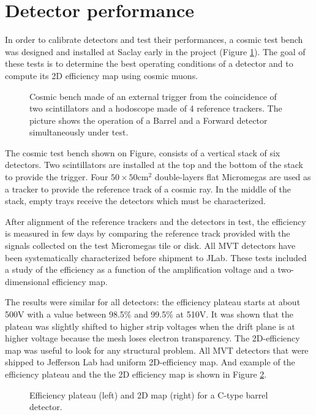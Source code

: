 \section{Detector performance}

In order to calibrate detectors and test their performances, a cosmic test bench was designed and installed at Saclay early in the project (Figure \ref{fig:mm-testbench}). The goal of these tests is to determine the best operating conditions of a detector and to compute its 2D efficiency map using cosmic muons.


\begin{figure}[htb]
 \caption{Cosmic bench made of an external trigger from the coincidence of two scintillators and a hodoscope made of 4 reference trackers. The picture shows the operation of a Barrel and a Forward detector simultaneously under test.}
 \label{fig:mm-testbench}
\end{figure}

The cosmic test bench shown on Figure, consists of a vertical stack of six detectors. Two scintillators are installed at the top and the bottom of the stack to provide the trigger. Four $50 \times 50 \text{cm}^2$ double-layers flat Micromegas are used as a tracker to provide the reference track of a cosmic ray. In the middle of the stack, empty trays receive the detectors which must be characterized.

After alignment of the reference trackers and the detectors in test, the efficiency is measured in few days by comparing the reference track provided with the signals collected on the test Micromegas tile or disk. All MVT detectors have been systematically characterized before shipment to JLab. These tests included a study of the efficiency as a function of the amplification voltage and a two-dimensional efficiency map.

The results were similar for all detectors: the efficiency plateau starts at about 500V with a value between 98.5\% and 99.5\% at 510V. It was shown that the plateau was slightly shifted to higher strip voltages when the drift plane is at higher voltage because the mesh loses electron transparency. The 2D-efficiency map was useful to look for any structural problem. All MVT detectors that were shipped to Jefferson Lab had uniform 2D-efficiency map. And example of the efficiency plateau and the the 2D efficiency map is shown in Figure \ref{fig:mm-fig8}.

\begin{figure}[htb]
 \caption{Efficiency plateau (left) and 2D map (right) for a C-type barrel detector.}
 \label{fig:mm-fig8}
\end{figure}

